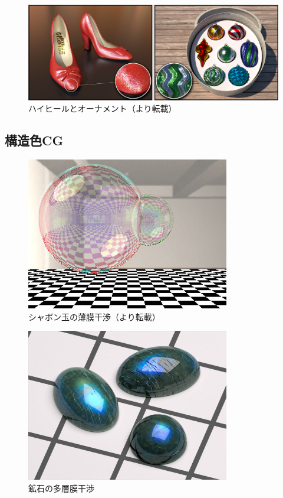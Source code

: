 \begin{figure}[hn]
  \centering
  \includegraphics[width=5.0in]{./img/heel_ornament.jpg}
  \caption{ハイヒールとオーナメント（\cite{jakob2014discrete}より転載）}
  \label{FHeelOrnament}
\end{figure}


\subsection{構造色CG}

\begin{figure}[htbp]
  \centering
  \includegraphics[width=3.5in]{./img/syabon_iwasaki.jpg}
  \caption{シャボン玉の薄膜干渉（\cite{iwasaki2004real}より転載）}
  \label{FSyabon}
\end{figure}

\begin{figure}[htbp]
  \centering
  \includegraphics[width=3.5in]{./img/kouseki_weidlich.jpg}
  \caption{鉱石の多層膜干渉\cite{weidlich2009rendering}}
  \label{FKouseki}
\end{figure}


